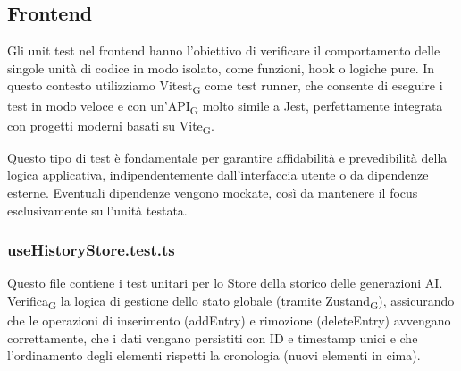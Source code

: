 \documentclass[11pt,a4paper]{article}
\newcommand{\gls}[1]{#1\textsubscript{G}}
\begin{document}
\newpage

\subsection{Frontend}
Gli unit test nel frontend hanno l’obiettivo di verificare il comportamento delle singole unità di codice in modo isolato, come funzioni, hook o logiche pure. In questo contesto utilizziamo \gls{Vitest} come test runner, che consente di eseguire i test in modo veloce e con un’\gls{API} molto simile a Jest, perfettamente integrata con progetti moderni basati su \gls{Vite}.

Questo tipo di test è fondamentale per garantire affidabilità e prevedibilità della logica applicativa, indipendentemente dall’interfaccia utente o da dipendenze esterne. Eventuali dipendenze vengono mockate, così da mantenere il focus esclusivamente sull’unità testata.

\subsubsection{useHistoryStore.test.ts}
Questo file contiene i test unitari per lo Store della storico delle generazioni AI. \gls{Verifica} la logica di gestione dello stato globale (tramite \gls{Zustand}), assicurando che le operazioni di inserimento (addEntry) e rimozione (deleteEntry) avvengano correttamente, che i dati vengano persistiti con ID e timestamp unici e che l'ordinamento degli elementi rispetti la cronologia (nuovi elementi in cima).
\end{document}
